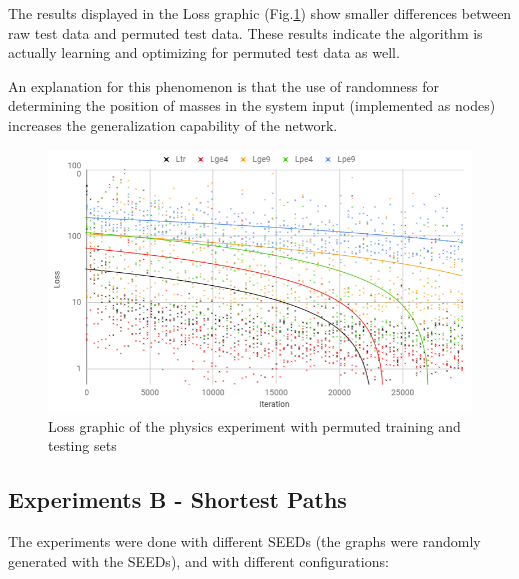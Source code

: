The results displayed in the Loss graphic (Fig.\ref{fig:physics_perm_results}) show smaller differences between raw test data and permuted test data. These results indicate the algorithm is actually learning and optimizing for permuted test data as well.

An explanation for this phenomenon is that the use of randomness for determining the position of masses in the system input (implemented as nodes) increases the generalization capability of the network.

\begin{figure}[H]
    \centering
    \includegraphics[width=.9\linewidth]{fig/content/results/physics/physics_perm_minium_squares.png}
    \caption{Loss graphic of the physics experiment with permuted training and testing sets}
    \label{fig:physics_perm_results}
\end{figure}

\subsection{Experiments B - Shortest Paths}

The experiments were done with different SEEDs (the graphs were randomly generated with the SEEDs), and with different configurations:

